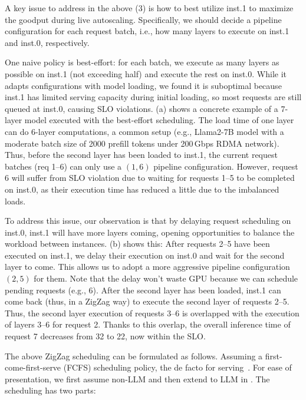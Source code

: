 A key issue to address in the above (3) is 
how to best utilize inst.1 to maximize the goodput during live autoscaling. 
Specifically, we should decide a pipeline configuration for each request batch,
i.e., how many layers to execute on inst.1 and inst.0, respectively.

One naive policy is best-effort:
for each batch, we execute as many layers as possible on inst.1 (not exceeding half)
and execute the rest on inst.0.
While it adapts configurations with model loading,
we found it is suboptimal because
inst.1 has limited serving capacity during initial loading,
so most requests are still queued at inst.0, causing SLO violations.
{} (a) shows a concrete example
of a 7-layer model executed with the best-effort scheduling.
The load time of one layer can do 6-layer computations,
a common setup (e.g., Llama2-7B model with a moderate batch size of 2000 prefill tokens under 200\,Gbps RDMA network).
Thus,
before the second layer has been loaded to inst.1,
the current request batches (req 1--6) can only use a $(1,6)$ pipeline configuration.
However, request 6 will suffer from SLO violation
due to waiting for requests 1--5 to be completed on inst.0,
as their execution time has reduced a little due to the imbalanced loads.

To address this issue, our observation is that
by delaying request scheduling on inst.0,
inst.1 will have more layers coming,
opening opportunities to balance the workload between instances.
{} (b) shows this:
After requests 2--5 have been executed on inst.1,
we delay their execution on inst.0 and wait for the second layer to come.
This allows us to adopt a more aggressive pipeline configuration $(2,5)$ for them.
Note that the delay won't waste GPU because we can schedule pending requests (e.g., 6).
After the second layer has been loaded,
inst.1 can come back (thus, in a ZigZag way) to execute the second layer of requests 2--5.
Thus, the second layer execution of requests 3--6
is overlapped with the execution of layers 3--6 for request 2.
Thanks to this overlap, the overall inference time of request 7
decreases from 32 to 22, now within the SLO.

The above ZigZag scheduling can be formulated as follows.
Assuming a first-come-first-serve (FCFS) scheduling policy,
the de facto for serving~\cite{vllm,DBLP:journals/corr/abs-2404-09526,DBLP:conf/osdi/YuJKKC22}.
For ease of presentation,
we first assume non-LLM and then extend to LLM in \textsection{\ref{sec:design-llm}}.
The scheduling has two parts:

